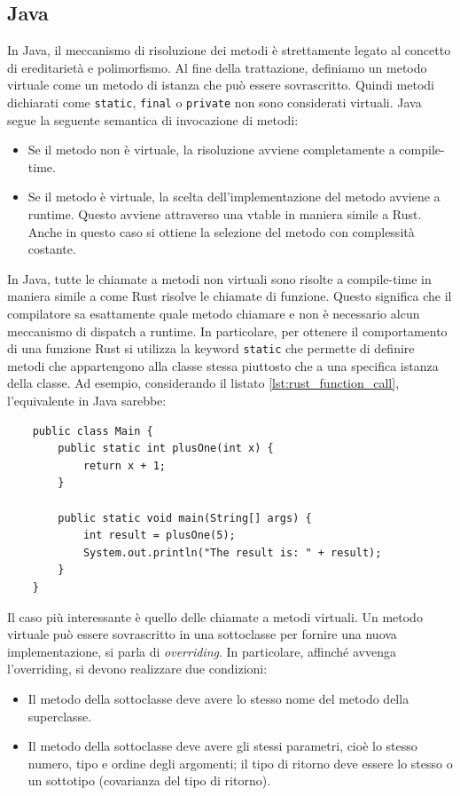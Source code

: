 \subsection{Java}
In Java, il meccanismo di risoluzione dei metodi è strettamente legato al concetto di ereditarietà e polimorfismo. Al fine della trattazione, definiamo un metodo virtuale come un metodo di istanza che può essere sovrascritto. Quindi metodi dichiarati come \texttt{static}, \texttt{final} o \texttt{private} non sono considerati virtuali. Java segue la seguente semantica di invocazione di metodi:
\begin{itemize}
    \item Se il metodo non è virtuale, la risoluzione avviene completamente a compile-time.
    \item Se il metodo è virtuale, la scelta dell'implementazione del metodo avviene a runtime. Questo avviene attraverso una vtable in maniera simile a Rust. Anche in questo caso si ottiene la selezione del metodo con complessità costante.
\end{itemize} 
In Java, tutte le chiamate a metodi non virtuali sono risolte a compile-time in maniera simile a come Rust risolve le chiamate di funzione. Questo significa che il compilatore sa esattamente quale metodo chiamare e non è necessario alcun meccanismo di dispatch a runtime. In particolare, per ottenere il comportamento di una funzione Rust si utilizza la keyword \texttt{static} che permette di definire metodi che appartengono alla classe stessa piuttosto che a una specifica istanza della classe. Ad esempio, considerando il listato \ref{lst:rust_function_call}, l'equivalente in Java sarebbe:
\begin{verbatim}
    public class Main {
        public static int plusOne(int x) {
            return x + 1;
        }

        public static void main(String[] args) {
            int result = plusOne(5);
            System.out.println("The result is: " + result);
        }
    }
\end{verbatim}
Il caso più interessante è quello delle chiamate a metodi virtuali. Un metodo virtuale può essere sovrascritto in una sottoclasse per fornire una nuova implementazione, si parla di \textit{overriding}. In particolare, affinché avvenga l'overriding, si devono realizzare due condizioni:
\begin{itemize}
    \item Il metodo della sottoclasse deve avere lo stesso nome del metodo della superclasse.
    \item Il metodo della sottoclasse deve avere gli stessi parametri, cioè lo stesso numero, tipo e ordine degli argomenti; il tipo di ritorno deve essere lo stesso o un sottotipo (covarianza del tipo di ritorno).
\end{itemize}
